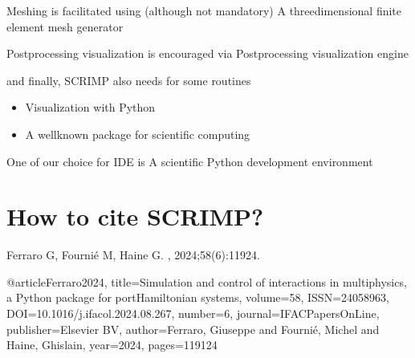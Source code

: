 \documentclass[letterpaper,10pt,english]{sphinxmanual}
\begin{document}
\sphinxAtStartPar
Meshing is facilitated using (although not mandatory)  \textendash{} A three\sphinxhyphen{}dimensional finite element mesh generator

\sphinxAtStartPar
Post\sphinxhyphen{}processing visualization is encouraged via  \textendash{} Post\sphinxhyphen{}processing visualization engine

\sphinxAtStartPar
and finally, SCRIMP also needs for some routines
\begin{itemize}
\item {} 
\sphinxAtStartPar
{} \textendash{} Visualization with Python

\item {} 
\sphinxAtStartPar
{} \textendash{} A well\sphinxhyphen{}known package for scientific computing

\end{itemize}

\sphinxAtStartPar
One of our choice for IDE is  \textendash{} A scientific Python development environment


\section{How to cite SCRIMP?}
\label{\detokenize{index:how-to-cite-scrimp}}
\sphinxAtStartPar
Ferraro G, Fournié M, Haine G.
, 2024;58(6):119\textendash{}24.

\begin{sphinxVerbatim}[commandchars=\\\{\}]
@articleFerraro2024,
  title=Simulation and control of interactions in multi\PYGZhy{}physics, a Python package for port\PYGZhy{}Hamiltonian systems,
  volume=58,
  ISSN=2405\PYGZhy{}8963,
  DOI=10.1016/j.ifacol.2024.08.267,
  number=6,
  journal=IFAC\PYGZhy{}PapersOnLine,
  publisher=Elsevier BV,
  author=Ferraro, Giuseppe and Fournié, Michel and Haine, Ghislain,
  year=2024,
  pages=119\PYGZhy{}\PYGZhy{}124
\end{sphinxVerbatim}
\end{document}
